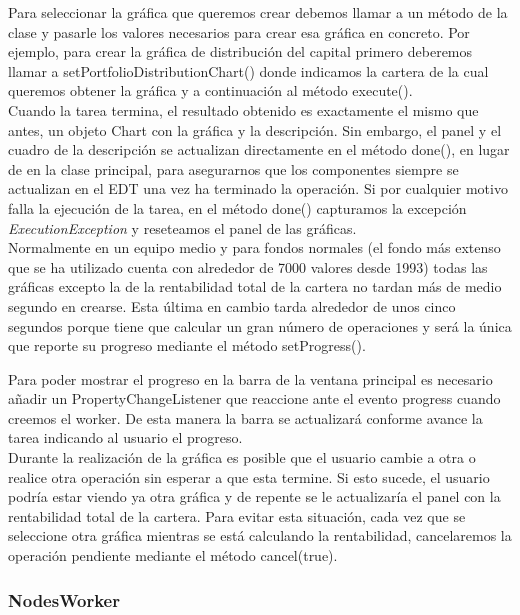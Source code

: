 \documentclass[12pt, a4paper]{book}
\begin{document}
Para seleccionar la gráfica que queremos crear debemos llamar a un método de la clase y pasarle los valores necesarios para crear esa gráfica en concreto. Por ejemplo, para crear la gráfica de distribución del capital primero deberemos llamar a setPortfolioDistributionChart() donde indicamos la cartera de la cual queremos obtener la gráfica y a continuación al método execute().\\

Cuando la tarea termina, el resultado obtenido es exactamente el mismo que antes, un objeto Chart con la gráfica y la descripción. Sin embargo, el panel y el cuadro de la descripción se actualizan directamente en el método done(), en lugar de en la clase principal, para asegurarnos que los componentes siempre se actualizan en el \gls{EDT} una vez ha terminado la operación. Si por cualquier motivo falla la ejecución de la tarea, en el método done() capturamos la excepción \textit{ExecutionException} y reseteamos el panel de las gráficas.\\

Normalmente en un equipo medio y para fondos normales (el fondo más extenso que se ha utilizado cuenta con alrededor de 7000 valores desde 1993) todas las gráficas excepto la de la rentabilidad total de la cartera no tardan más de medio segundo en crearse. Esta última en cambio tarda alrededor de unos cinco segundos porque tiene que calcular un gran número de operaciones y  será la única que reporte su progreso mediante el método setProgress().\\


\newpage

Para poder mostrar el progreso en la barra de la ventana principal es necesario añadir un PropertyChangeListener que reaccione ante el evento progress cuando creemos el worker. De esta manera la barra se actualizará conforme avance la tarea indicando al usuario el progreso.\\


Durante la realización de la gráfica es posible que el usuario cambie a otra o realice otra operación sin esperar a que esta termine. Si esto sucede, el usuario podría estar viendo ya otra gráfica y de repente se le actualizaría el panel con la rentabilidad total de la cartera. Para evitar esta situación, cada vez que se seleccione otra gráfica mientras se está calculando la rentabilidad, cancelaremos la operación pendiente mediante el método cancel(true).


\subsubsection{NodesWorker}
\end{document}
